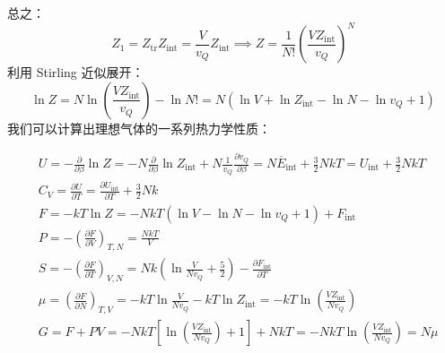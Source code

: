 总之：
\begin{equation}
    Z_1=Z_{\mathrm{tr}}Z_{\mathrm{int}}=\frac{V}{v_Q}Z_{\mathrm{int}}
    \implies
    Z=\frac{1}{N!}\left(\frac{VZ_{\mathrm{int}}}{v_Q}\right)^N
\end{equation}
利用 Stirling 近似展开：
\begin{equation}
    \ln Z
    =N\ln\left(\frac{VZ_{\mathrm{int}}}{v_Q}\right)-\ln N!
    = N\left(\ln V+\ln Z_{\mathrm{int}}-\ln N-\ln v_Q+1\right)
\end{equation}
我们可以计算出理想气体的一系列热力学性质：
\begin{corollary}[理想气体的热力学性质]
    \begin{align}
        &U=-\frac{\partial}{\partial \beta}\ln Z =-N\frac{\partial}{\partial \beta}\ln Z_{\mathrm{int}}+N\frac{1}{v_Q}\frac{\partial v_Q}{\partial \beta}= N\overline E_{\mathrm{int}}+\frac{3}{2}NkT=U_{\mathrm{int}}+\frac{3}{2}NkT\\
        &C_V=\frac{\partial U}{\partial T}=\frac{\partial U_{\mathrm{int}}}{\partial T}+\frac{3}{2}Nk\\
        &F=-kT\ln Z=-NkT\left(\ln V -\ln N-\ln v_Q+1\right)+  F_{\mathrm{int}}\\
        &P=-\left(\frac{\partial F}{\partial V}\right)_{T,N}=\frac{NkT}{V}\\
        &S=-\left(\frac{\partial F}{\partial T}\right)_{V,N}=Nk\left(\ln\frac{V}{Nv_Q}+\frac{5}{2}\right)-\frac{\partial F_{\mathrm{int}}}{\partial T}\\
        &\mu=\left(\frac{\partial F}{\partial N}\right)_{T,V}= -kT\ln\frac{V}{Nv_Q}-kT\ln Z_{\mathrm{int}} =-kT\ln\left(\frac{VZ_{\mathrm{int}}}{Nv_Q}\right)\\
        &G=F+PV=-NkT\left[\ln\left(\frac{VZ_{\mathrm{int}}}{Nv_Q}\right)+1\right]+NkT=-NkT\ln\left(\frac{VZ_{\mathrm{int}}}{Nv_Q}\right)=N\mu
    \end{align}
\end{corollary}